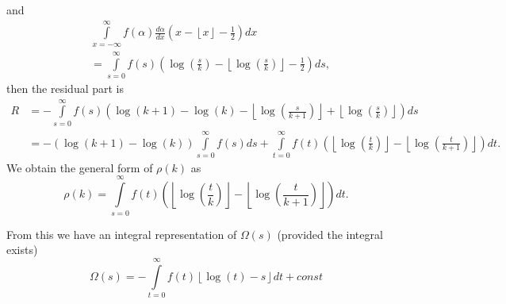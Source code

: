 \documentclass[titlepage,fleqn]{article}%
\begin{document}
and%
\begin{align*}
&
{\displaystyle\int\limits_{x=-\infty}^{\infty}}
f(\alpha)\frac{d\alpha}{dx}\left(  x-\left\lfloor x\right\rfloor -\frac{1}%
{2}\right)  dx\\
&  =%
{\displaystyle\int\limits_{s=0}^{\infty}}
f(s)\left(  \log\left(  \frac{s}{k}\right)  -\left\lfloor \log\left(  \frac
{s}{k}\right)  \right\rfloor -\frac{1}{2}\right)  ds,
\end{align*}
then the residual part is%
\begin{align}
R  &  =-%
{\displaystyle\int\limits_{s=0}^{\infty}}
f(s)\left(  \log(k+1)-\log(k)-\left\lfloor \log\left(  \frac{s}{k+1}\right)
\right\rfloor +\left\lfloor \log\left(  \frac{s}{k}\right)  \right\rfloor
\right)  ds\label{Rform}\\
&  =-\left(  \log(k+1)-\log(k)\right)
{\displaystyle\int\limits_{s=0}^{\infty}}
f(s)ds+%
{\displaystyle\int\limits_{t=0}^{\infty}}
f(t)\left(  \left\lfloor \log\left(  \frac{t}{k}\right)  \right\rfloor
-\left\lfloor \log\left(  \frac{t}{k+1}\right)  \right\rfloor \right)
dt.\nonumber
\end{align}
We obtain the general form of $\rho(k)$ as%
\begin{equation}
\rho(k)=%
{\displaystyle\int\limits_{s=0}^{\infty}}
f(t)\left(  \left\lfloor \log\left(  \frac{t}{k}\right)  \right\rfloor
-\left\lfloor \log\left(  \frac{t}{k+1}\right)  \right\rfloor \right)  dt.
\label{EM5}%
\end{equation}


From this we have an integral representation of $\Omega(s)$ (provided the
integral exists)%
\begin{equation}
\Omega(s)=-%
{\displaystyle\int\limits_{t=0}^{\infty}}
f(t)\left\lfloor \log\left(  t\right)  -s\right\rfloor dt+const
\label{OmegaInt}%
\end{equation}
\bigskip
\end{document}
